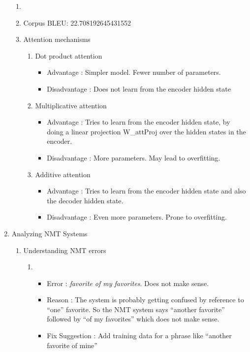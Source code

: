\documentclass[]{article}
\begin{document}
\begin{enumerate}
\begin{enumerate}
		\item 
		\item Corpus BLEU: 22.708192645431552
		\item 
		Attention mechanisms
		\begin{enumerate}
			\item Dot product attention
					\begin{itemize}
						\item Advantage : Simpler model. Fewer number of parameters.
						\item Disadvantage : Does not learn from the encoder hidden state
					\end{itemize}
			\item Multiplicative attention
					\begin{itemize}
						\item Advantage : Tries to learn from the encoder hidden state, by doing a linear projection W\_attProj over the hidden states in the encoder.
						\item Disadvantage : More parameters. May lead to overfitting. 
					\end{itemize}
			\item Additive attention
					\begin{itemize}
						\item Advantage : Tries to learn from the encoder hidden state and also the decoder hidden state.  
						\item Disadvantage : Even more parameters. Prone to overfitting. 
					\end{itemize}
		\end{enumerate}
		
	\end{enumerate}
	
	\item Analyzing NMT Systems
	\begin{enumerate}
		\item
		Understanding NMT errors
		
			\begin{enumerate}
					\item 
					\begin{itemize}
						\item Error : \textit{favorite of my favorites}. Does not make sense.
						\item Reason : The system is probably getting confused by reference to \enquote{one} favorite. So the NMT system says \enquote{another favorite} followed by \enquote{of my favorites} which does not make sense.
						\item Fix Suggestion : Add training data for a phrase like \enquote{another favorite of mine}
					\end{itemize}
				

\end{enumerate}
\end{enumerate}
\end{enumerate}
\end{document}
